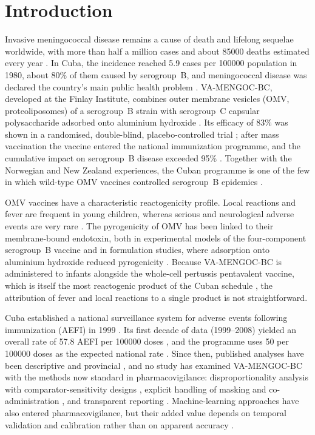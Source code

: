 \documentclass[11pt]{article}
\begin{document}
\clearpage
\section{Introduction}\label{sec:intro}

Invasive meningococcal disease remains a cause of death and lifelong sequelae worldwide, with more
than half a million cases and about \num{85000} deaths estimated every year
\cite{SierraGonzalez2019}. In Cuba, the incidence reached 5.9 cases per \num{100000} population in
1980, about 80\% of them caused by serogroup~B, and meningococcal disease was declared the
country's main public health problem \cite{SierraGonzalez2019}. VA-MENGOC-BC, developed at the
Finlay Institute, combines outer membrane vesicles (OMV, proteoliposomes) of a serogroup~B strain
with serogroup~C capsular polysaccharide adsorbed onto aluminium hydroxide
\cite{Sotolongo2007,Uli2006,Masforrol2017}. Its efficacy of 83\% was shown in a randomised,
double-blind, placebo-controlled trial \cite{Sierra1991}; after mass vaccination the vaccine
entered the national immunization programme, and the cumulative impact on serogroup~B disease
exceeded 95\% \cite{Rodriguez1999,SierraGonzalez2019}. Together with the Norwegian and New Zealand
experiences, the Cuban programme is one of the few in which wild-type OMV vaccines controlled
serogroup~B epidemics \cite{Holst2009,Holst2013}.

OMV vaccines have a characteristic reactogenicity profile. Local reactions and fever are frequent
in young children, whereas serious and neurological adverse events are very rare
\cite{Nokleby2007,Holst2009}. The pyrogenicity of OMV has been linked to their membrane-bound
endotoxin, both in experimental models of the four-component serogroup~B vaccine
\cite{Sheerin2019} and in formulation studies, where adsorption onto aluminium hydroxide reduced
pyrogenicity \cite{Rosenqvist1998}. Because VA-MENGOC-BC is administered to infants alongside the
whole-cell pertussis pentavalent vaccine, which is itself the most reactogenic product of the
Cuban schedule \cite{Galindo2012,CruzRodriguez2021}, the attribution of fever and local reactions
to a single product is not straightforward.

Cuba established a national surveillance system for adverse events following immunization (AEFI)
in 1999 \cite{Galindo2012,Reed2007}. Its first decade of data (1999--2008) yielded an overall
rate of 57.8 AEFI per \num{100000} doses \cite{Galindo2012}, and the programme uses 50 per \num{100000}
doses as the expected national rate \cite{CruzRodriguez2021}. Since then, published analyses have
been descriptive and provincial \cite{CruzRodriguez2021}, and no study has examined VA-MENGOC-BC
with the methods now standard in pharmacovigilance: disproportionality analysis with
comparator-sensitivity designs \cite{Evans2001,vanPuijenbroek2002,Bate1998,Noren2013,DuMouchel1999},
explicit handling of masking and co-administration \cite{Maignen2014,Salvo2013}, and transparent
reporting \cite{Fusaroli2024Statement,Fusaroli2024Elaboration}. Machine-learning approaches have
also entered pharmacovigilance, but their added value depends on temporal validation and
calibration rather than on apparent accuracy \cite{Salas2022,Collins2024,VanCalster2019}.
\end{document}
